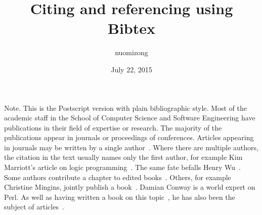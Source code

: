 \documentclass[10pt,a4paper]{article}
\begin{document}
	
	\author{nuomizong}
	\title{Citing and referencing using Bibtex}
	\date{July 22, 2015}
	
	\maketitle
	
	\newpage
	
	Note. This is the Postscript version with plain bibliographic style. 
	Most of the academic staff in the School of Computer Science and Software Engineering have publications in their field of expertise or research. The majority of the publications appear in journals or proceedings of conferences. Articles appearing in journals may be written by a single author~\cite{Meyer2000}. Where there are multiple authors, the citation in the text usually names only the first author, for example Kim Marriott's article on logic programming~\cite{Codishetal2000}. The same fate befalls Henry Wu~\cite{Huetal2000}. Some authors contribute a chapter to edited books~\cite{WallaceandKorb1999}. Others, for example Christine Mingins, jointly publish a book~\cite{Jezequeletal2000}. Damian Conway is a world expert on Perl. As well as having written a book on this topic~\cite{Conway2000}, he has also been the subject of articles~\cite{Johnston2000}.
	
	\cite*{Meyer2000}
	
	\cite[Huetal2000]{Huetal2000}
	
	
\end{document}

